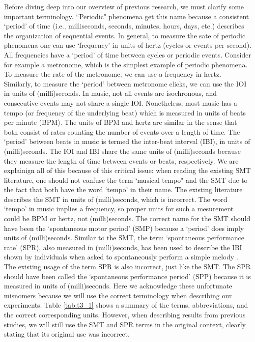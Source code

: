 \documentclass{report}
\begin{document}
Before diving deep into our overview of previous research, we must clarify some important terminology. ``Periodic" phenomena get this name because a consistent `period' of time (i.e., milliseconds, seconds, minutes, hours, days, etc.) describes the organization of sequential events. In general, to measure the sate of periodic phenomena one can use `frequency' in units of hertz (cycles or events per second). All frequencies have a `period' of time between cycles or periodic events. Consider for example a metronome, which is the simplest example of periodic phenomena. To measure the rate of the metronome, we can use a frequency in hertz. Similarly, to measure the `period' between metronome clicks, we can use the IOI in units of (milli)seconds. In music, not all events are isochronous, and consecutive events may not share a single IOI. Nonetheless, most music has a tempo (or frequency of the underlying beat) which is measured in units of beats per minute (BPM). The units of BPM and hertz are similar in the sense that both consist of rates counting the number of events over a length of time. The `period' between beats in music is termed the inter-beat interval (IBI), in units of (milli)seconds. The IOI and IBI share the same units of (milli)seconds because they measure the length of time between events or beats, respectively. We are explainign all of this because of this critical issue: when reading the existing SMT literature, one should not confuse the term `musical tempo" and the SMT due to the fact that both have the word `tempo' in their name. The existing literature describes the SMT in units of (milli)seconds, which is incorrect. The word `tempo' in music implies a frequency, so proper units for such a mesurement could be BPM or hertz, not (milli)seconds. The correct name for the SMT should have been the `spontaneous motor period' (SMP) because a `period' does imply units of (milli)seconds. Similar to the SMT, the term `spontaneous performance rate' (SPR), also measured in (milli)seconds, has been used to describe the IBI shown by individuals when asked to spontaneously perform a simple melody \cite{zamm2016endogenous}. The existing usage of the term SPR is also incorrect, just like the SMT. The SPR should have been called the `spontaneous performance period' (SPP) because it is measured in units of (milli)seconds. Here we acknowledge these unfortunate misnomers because we will use the correct terminology when describing our experiments. Table \ref{tab:t3_1} shows a summary of the terms, abbreviations, and the correct corresponding units. However, when describing results from previous studies, we will still use the SMT and SPR terms in the original context, clearly stating that its original use was incorrect. 
\end{document}
